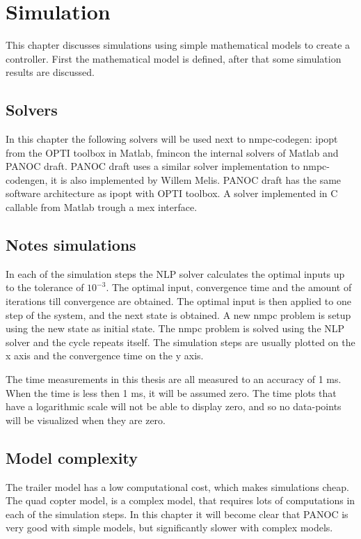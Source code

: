 \chapter{Simulation}
This chapter discusses simulations using simple mathematical models to create a controller. First the mathematical model is defined, after that some simulation results are discussed.

\section{Solvers}
In this chapter the following solvers will be used next to nmpc-codegen: ipopt from the OPTI toolbox in Matlab, fmincon the internal solvers of Matlab and PANOC draft. PANOC draft uses a similar solver implementation to nmpc-codengen, it is also implemented by Willem Melis. PANOC draft has the same software architecture as ipopt with OPTI toolbox. A solver implemented in C callable from Matlab trough a mex interface.

\section{Notes simulations}
In each of the simulation steps the NLP solver calculates the optimal inputs up to the tolerance of $10^{-3}$. The optimal input, convergence time and the amount of iterations till convergence are obtained. The optimal input is then applied to one step of the system, and the next state is obtained. A new nmpc problem is setup using the new state as initial state. The nmpc problem is solved using the NLP solver and the cycle repeats itself. The simulation steps are usually plotted on the x axis and the convergence time on the y axis.

The time measurements in this thesis are all measured to an accuracy of 1 ms. When the time is less then 1 ms, it will be assumed zero. The time plots that have a logarithmic scale will not be able to display zero, and so no data-points will be visualized when they are zero.

\section{Model complexity}
The trailer model has a low computational cost, which makes simulations cheap. The quad copter model, is a complex model, that requires lots of computations in each of the simulation steps. In this chapter it will become clear that PANOC is very good with simple models, but significantly slower with complex models.

